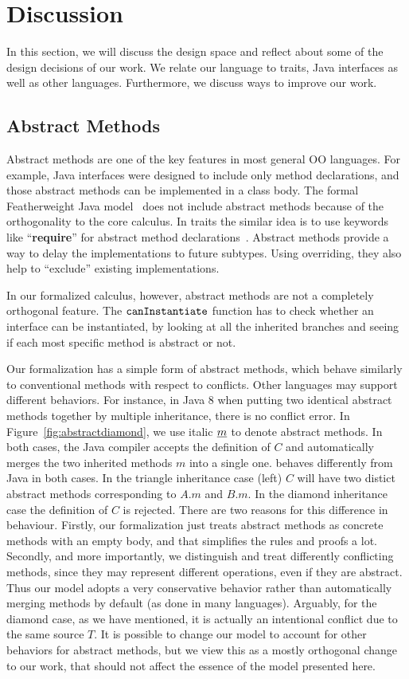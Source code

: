 \section{Discussion}\label{sec:discussion}
In this section, we will discuss the design space and reflect about some of the design decisions of our work. We relate 
our language to traits, Java interfaces as well as other languages. Furthermore, we discuss
ways to improve our work.

\subsection{Abstract Methods}

Abstract methods are one of the key features in most general OO languages. For example, Java interfaces were designed
to include only method declarations, and those abstract methods can be implemented in a class body. 
The formal Featherweight Java model~\cite{Igarashi01FJ} does not include abstract methods because of the orthogonality
to the core calculus. In traits the
similar idea is to use keywords like ``\textbf{require}'' for abstract method declarations~\cite{scharli03traits}.
Abstract methods provide a way to
delay the implementations to future subtypes. Using overriding, they also help to ``exclude'' existing implementations.

In our formalized calculus, however, abstract methods are not a completely orthogonal feature. The $\texttt{canInstantiate}$ function
has to check whether an interface can be instantiated, by looking at all the inherited branches and seeing if each most specific method
is abstract or not.

Our formalization has a simple form of abstract methods, which behave similarly to conventional methods with respect to conflicts.
Other languages may support different behaviors.
For instance, in Java 8 when putting two identical abstract methods together by multiple inheritance, there is no conflict error. In Figure~\ref{fig:abstractdiamond}, we use italic $\emph{m}$ to denote abstract methods. In both cases, the Java compiler accepts the definition of $C$ and automatically merges the two inherited methods $m$ into a single one. \MIM{} behaves differently from Java in both cases.
In the triangle inheritance case (left) $C$ will have two distict abstract methods corresponding to $A.m$ and $B.m$. 
In the diamond inheritance case the definition of $C$ is rejected. 
There are two reasons for this difference in behaviour. Firstly, our formalization just treats abstract methods as concrete methods with an empty body, and that simplifies
the rules and proofs a lot. Secondly, and more importantly, we distinguish and treat differently conflicting methods, since they may represent different operations, even if they are abstract. Thus our model adopts a very conservative behavior rather than automatically merging 
methods by default (as done in many languages). 
Arguably, for the diamond case, as we have mentioned, it is actually an intentional conflict due to the same source $T$.
It is possible to change our model to account for other behaviors for abstract methods, but we view this as a mostly 
orthogonal change to our work, that should not affect the essence of the model presented here.

